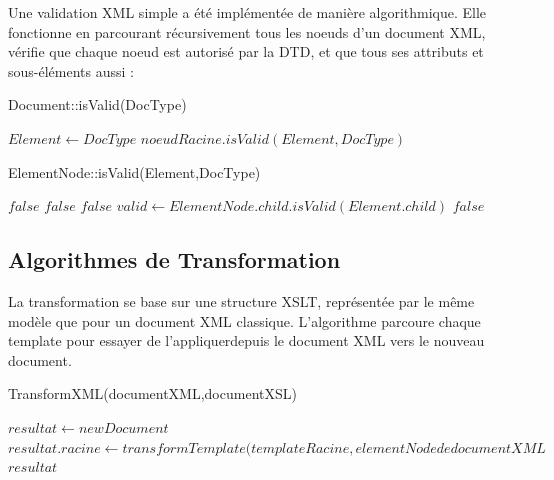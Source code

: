 Une validation XML simple a été implémentée de manière algorithmique. Elle fonctionne en parcourant récursivement tous les noeuds d'un document XML, vérifie que chaque noeud est autorisé par la DTD, et que tous ses attributs et sous-éléments aussi :

\begin{algorithm}
\caption{Document::isValid(DocType)}
\begin{algorithmic}
\STATE $Element \leftarrow DocType$
\RETURN $noeudRacine.isValid(Element,DocType)$
\end{algorithmic}
\end{algorithm}

\begin{algorithm}
\caption{ElementNode::isValid(Element,DocType)}
\begin{algorithmic}
\RETURN $false$
\ENDIF
{}
\RETURN $false$
\ENDIF
\ENDFOR
{}
\RETURN $false$
\ENDIF
\STATE $valid \leftarrow ElementNode.child.isValid(Element.child)$
\RETURN $false$
\ENDIF
\ENDFOR
\end{algorithmic}
\end{algorithm}

\subsection{Algorithmes de Transformation}

La transformation se base sur une structure XSLT, représentée par le même modèle que pour un document XML classique. L'algorithme parcoure chaque template pour essayer de l'appliquerdepuis le document XML vers le nouveau document.

\newpage

\begin{algorithm}
\caption{TransformXML(documentXML,documentXSL)}
\begin{algorithmic}
\STATE $resultat \leftarrow new Document$
\STATE $resultat.racine \leftarrow transformTemplate(templateRacine,elementNode de documentXML$
\ENDIF
\ENDFOR
\RETURN $resultat$
\end{algorithmic}
\end{algorithm}

